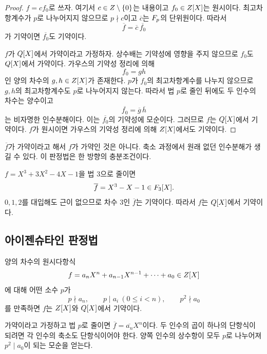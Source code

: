 \begin{proof}
$f=c f_0$로 쓰자. 여기서 $c\in Z\setminus\{0\}$는 내용이고 $f_0\in Z[X]$는 원시이다. 최고차항계수가 $p$로 나누어지지 않으므로 $p\nmid c$이고 $\overline c$는 $F_p$의 단위원이다. 따라서
\[
  \overline f=\overline c\,\overline{f_0}
\]
가 기약이면 $\overline{f_0}$도 기약이다.

$f$가 $Q[X]$에서 가약이라고 가정하자. 상수배는 기약성에 영향을 주지 않으므로 $f_0$도 $Q[X]$에서 가약이다. 가우스의 기약성 정리에 의해
\[
  f_0=gh
\]
인 양의 차수의 $g,h\in Z[X]$가 존재한다. $p$가 $f_0$의 최고차항계수를 나누지 않으므로 $g,h$의 최고차항계수도 $p$로 나누어지지 않는다. 따라서 법 $p$로 줄인 뒤에도 두 인수의 차수는 양수이고
\[
  \overline{f_0}=\overline g\,\overline h
\]
는 비자명한 인수분해이다. 이는 $\overline{f_0}$의 기약성에 모순이다. 그러므로 $f$는 $Q[X]$에서 기약이다. $f$가 원시이면 가우스의 기약성 정리에 의해 $Z[X]$에서도 기약이다.
\end{proof}

\begin{pitfall}
$\overline f$가 가약이라고 해서 $f$가 가약인 것은 아니다. 축소 과정에서 원래 없던 인수분해가 생길 수 있다. 이 판정법은 한 방향의 충분조건이다.
\end{pitfall}

\begin{example}
$f=X^3+3X^2-4X-1$을 법 $3$으로 줄이면
\[
 \overline f=X^3-X-1\in F_3[X].
\]
$0,1,2$를 대입해도 근이 없으므로 차수 $3$인 $\overline f$는 기약이다. 따라서 $f$는 $Q[X]$에서 기약이다.
\end{example}

\subsection{아이젠슈타인 판정법}

\begin{theorem}
양의 차수의 원시다항식
\[
 f=a_nX^n+a_{n-1}X^{n-1}+\cdots+a_0\in Z[X]
\]
에 대해 어떤 소수 $p$가
\[
 p\nmid a_n,\qquad
 p\mid a_i\ (0\le i<n),\qquad
 p^2\nmid a_0
\]
를 만족하면 $f$는 $Z[X]$와 $Q[X]$에서 기약이다.
\end{theorem}

\begin{proofidea}
가약이라고 가정하고 법 $p$로 줄이면 $\overline f=\overline{a_n}X^n$이다. 두 인수의 곱이 하나의 단항식이 되려면 각 인수의 축소도 단항식이어야 한다. 양쪽 인수의 상수항이 모두 $p$로 나누어져 $p^2\mid a_0$이 되는 모순을 얻는다.
\end{proofidea}

